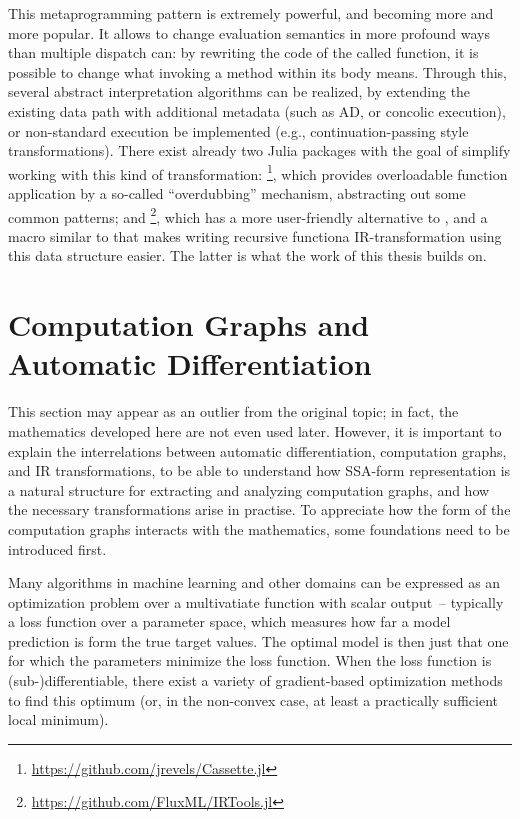 This metaprogramming pattern is extremely powerful, and becoming more and more popular.  It allows
to change evaluation semantics in more profound ways than multiple dispatch can: by rewriting the
code of the called function, it is possible to change what invoking a method within its body means.
Through this, several abstract interpretation algorithms can be realized, by extending the existing
data path with additional metadata (such as AD, or concolic execution), or non-standard execution be
implemented (e.g., continuation-passing style transformations).  There exist already two Julia
packages with the goal of simplify working with this kind of transformation:
\footnote{\protect\url{https://github.com/jrevels/Cassette.jl}}, which
provides overloadable function application by a so-called \enquote{overdubbing} mechanism,
abstracting out some common patterns; and
\footnote{\protect\url{https://github.com/FluxML/IRTools.jl}}, which has a
more user-friendly alternative to , and a macro similar to  that
makes writing recursive functiona IR-transformation using this data structure easier.  The latter is
what the work of this thesis builds on.


\section{Computation Graphs and Automatic Differentiation}
\label{sec:cg-ad}

This section may appear as an outlier from the original topic; in fact, the mathematics developed
here are not even used later.  However, it is important to explain the interrelations between
automatic differentiation, computation graphs, and IR transformations, to be able to understand how
SSA-form representation is a natural structure for extracting and analyzing computation graphs, and
how the necessary transformations arise in practise.  To appreciate how the form of the computation
graphs interacts with the mathematics, some foundations need to be introduced first.

Many algorithms in machine learning and other domains can be expressed as an optimization problem
over a multivatiate function with scalar output~-- typically a loss function over a parameter space,
which measures how far a model prediction is form the true target values.  The optimal model is then
just that one for which the parameters minimize the loss function.  When the loss function is
(sub-)differentiable, there exist a variety of gradient-based optimization methods to find this
optimum (or, in the non-convex case, at least a practically sufficient local minimum).

